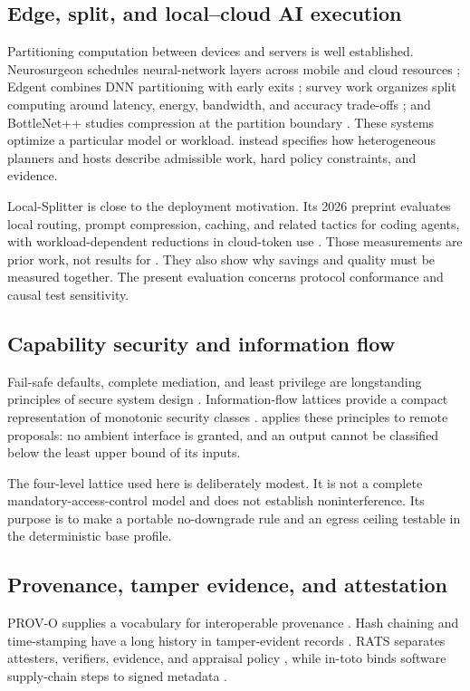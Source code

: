\subsection{Edge, split, and local--cloud AI execution}
Partitioning computation between devices and servers is well established. Neurosurgeon schedules neural-network layers across mobile and cloud resources \cite{Kang2017}; Edgent combines DNN partitioning with early exits \cite{Li2018}; survey work organizes split computing around latency, energy, bandwidth, and accuracy trade-offs \cite{Matsubara2022}; and BottleNet++ studies compression at the partition boundary \cite{Shao2019}. These systems optimize a particular model or workload. \AUEC instead specifies how heterogeneous planners and hosts describe admissible work, hard policy constraints, and evidence.

Local-Splitter is close to the deployment motivation. Its 2026 preprint evaluates local routing, prompt compression, caching, and related tactics for coding agents, with workload-dependent reductions in cloud-token use \cite{LocalSplitter2026}. Those measurements are prior work, not results for \AUEC{}. They also show why savings and quality must be measured together. The present evaluation concerns protocol conformance and causal test sensitivity.

\subsection{Capability security and information flow}
Fail-safe defaults, complete mediation, and least privilege are longstanding principles of secure system design \cite{SaltzerSchroeder1975}. Information-flow lattices provide a compact representation of monotonic security classes \cite{Denning1976}. \AUEC applies these principles to remote proposals: no ambient interface is granted, and an output cannot be classified below the least upper bound of its inputs.

The four-level lattice used here is deliberately modest. It is not a complete mandatory-access-control model and does not establish noninterference. Its purpose is to make a portable no-downgrade rule and an egress ceiling testable in the deterministic base profile.

\subsection{Provenance, tamper evidence, and attestation}
PROV-O supplies a vocabulary for interoperable provenance \cite{PROVO2013}. Hash chaining and time-stamping have a long history in tamper-evident records \cite{HaberStornetta1991}. RATS separates attesters, verifiers, evidence, and appraisal policy \cite{RFC9334}, while in-toto binds software supply-chain steps to signed metadata \cite{InToto2019}.

